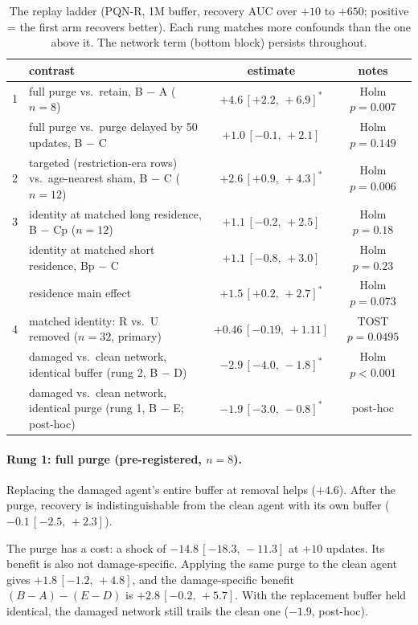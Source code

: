 \documentclass[10pt]{article} %
\newcommand{\sig}{^{\ast}}
\newcommand{\ci}[2]{\,[#1,\,#2]}
\begin{document}
\begin{table}[t]
\centering
\caption{The replay ladder (PQN-R, 1M buffer, recovery AUC over $+10$ to $+650$; positive = the first arm recovers better). Each rung matches more confounds than the one above it. The network term (bottom block) persists throughout.}
\label{tab:ladder}
\small
\begin{tabular}{p{0.5cm}p{6.8cm}cc}
\toprule
& contrast & estimate & notes \\
\midrule
1 & full purge vs.\ retain, B $-$ A ($n=8$) & $+4.6\ci{+2.2}{+6.9}\sig$ & Holm $p=0.007$ \\
  & full purge vs.\ purge delayed by 50 updates, B $-$ C & $+1.0\ci{-0.1}{+2.1}$ & Holm $p=0.149$ \\
2 & targeted (restriction-era rows) vs.\ age-nearest sham, B $-$ C ($n=12$) & $+2.6\ci{+0.9}{+4.3}\sig$ & Holm $p=0.006$ \\
3 & identity at matched long residence, B $-$ Cp ($n=12$) & $+1.1\ci{-0.2}{+2.5}$ & Holm $p=0.18$ \\
  & identity at matched short residence, Bp $-$ C & $+1.1\ci{-0.8}{+3.0}$ & Holm $p=0.23$ \\
  & residence main effect & $+1.5\ci{+0.2}{+2.7}\sig$ & Holm $p=0.073$ \\
4 & matched identity: R vs.\ U removed ($n=32$, primary) & $+0.46\ci{-0.19}{+1.11}$ & TOST $p=0.0495$ \\
\midrule
  & damaged vs.\ clean network, identical buffer (rung 2, B $-$ D) & $-2.9\ci{-4.0}{-1.8}\sig$ & Holm $p<0.001$ \\
  & damaged vs.\ clean network, identical purge (rung 1, B $-$ E; post-hoc) & $-1.9\ci{-3.0}{-0.8}\sig$ & post-hoc \\
\bottomrule
\end{tabular}
\end{table}

\paragraph{Rung 1: full purge (pre-registered, $n=8$).}
Replacing the damaged agent's entire buffer at removal helps ($+4.6$). After the purge, recovery is indistinguishable from the clean agent with its own buffer ($-0.1\ci{-2.5}{+2.3}$).

The purge has a cost: a shock of $-14.8\ci{-18.3}{-11.3}$ at $+10$ updates. Its benefit is also not damage-specific. Applying the same purge to the clean agent gives $+1.8\ci{-1.2}{+4.8}$, and the damage-specific benefit $(B-A)-(E-D)$ is $+2.8\ci{-0.2}{+5.7}$. With the replacement buffer held identical, the damaged network still trails the clean one ($-1.9$, post-hoc).
\end{document}
